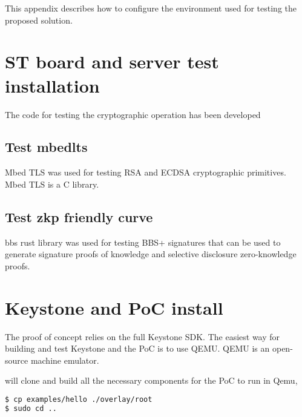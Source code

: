 This appendix describes how to configure the environment used for testing the proposed solution.
\section{ST board and server test installation}
The code for testing the cryptographic operation has been developed 
\subsection*{Test mbedlts}
Mbed TLS was used for testing RSA and ECDSA cryptographic primitives. Mbed TLS is a C library.  

\subsection*{Test zkp friendly curve }
bbs rust library was used for testing BBS+ signatures that can be used to generate signature proofs of knowledge and selective disclosure zero-knowledge proofs.

 
\section{Keystone and PoC install}

The proof of concept relies on the full Keystone SDK. The easiest way for building and test Keystone and the PoC is to use QEMU. QEMU is an open-source machine emulator.

 will clone and build all the necessary components for the PoC to run in Qemu,
\begin{lstlisting}[language=bash]
$ cp examples/hello ./overlay/root
$ sudo cd ..
\end{lstlisting}